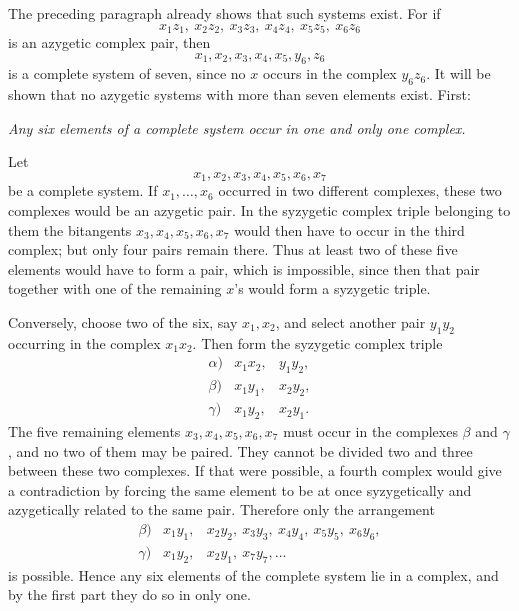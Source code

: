 \documentclass[11pt]{article}
\begin{document}
The preceding paragraph already shows that such systems exist. For if
\[
 x_1z_1,\ x_2z_2,\ x_3z_3,\ x_4z_4,\ x_5z_5,\ x_6z_6
\]
is an azygetic complex pair, then
\[
 x_1,x_2,x_3,x_4,x_5,y_6,z_6
\]
is a complete system of seven, since no \(x\) occurs in the complex \(y_6z_6\). It will be shown that no azygetic systems with more than seven elements exist. First:

\emph{Any six elements of a complete system occur in one and only one complex.}

Let
\begin{equation}
 x_1,x_2,x_3,x_4,x_5,x_6,x_7
 \tag{1}
\end{equation}
be a complete system. If \(x_1,\ldots,x_6\) occurred in two different complexes, these two complexes would be an azygetic pair. In the syzygetic complex triple belonging to them the bitangents \(x_3,x_4,x_5,x_6,x_7\) would then have to occur in the third complex; but only four pairs remain there. Thus at least two of these five elements would have to form a pair, which is impossible, since then that pair together with one of the remaining \(x\)'s would form a syzygetic triple.

Conversely, choose two of the six, say \(x_1,x_2\), and select another pair \(y_1y_2\) occurring in the complex \(x_1x_2\). Then form the syzygetic complex triple
\begin{equation}
\begin{array}{lll}
\alpha)&x_1x_2,&y_1y_2,\\
\beta)&x_1y_1,&x_2y_2,\\
\gamma)&x_1y_2,&x_2y_1.
\end{array}
\tag{2}
\end{equation}
The five remaining elements \(x_3,x_4,x_5,x_6,x_7\) must occur in the complexes \(\beta\) and \(\gamma\), and no two of them may be paired. They cannot be divided two and three between these two complexes. If that were possible, a fourth complex would give a contradiction by forcing the same element to be at once syzygetically and azygetically related to the same pair. Therefore only the arrangement
\begin{equation}
\begin{array}{lll}
\beta)&x_1y_1,&x_2y_2,\ x_3y_3,\ x_4y_4,\ x_5y_5,\ x_6y_6,\\
\gamma)&x_1y_2,&x_2y_1,\ x_7y_7,\ldots
\end{array}
\tag{3}
\end{equation}
is possible. Hence any six elements of the complete system lie in a complex, and by the first part they do so in only one.
\end{document}
